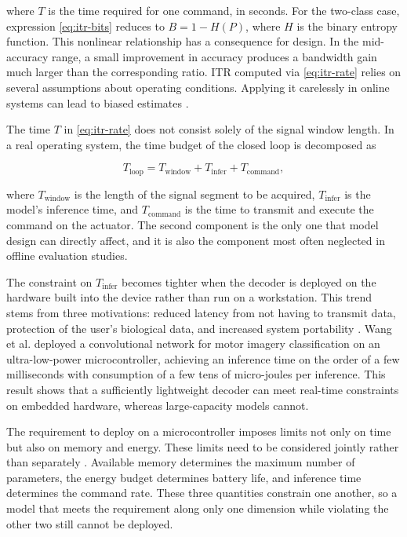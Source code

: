 where $T$ is the time required for one command, in seconds. For the
two-class case, expression \eqref{eq:itr-bits} reduces to
$B = 1 - H(P)$, where $H$ is the binary entropy function. This
nonlinear relationship has a consequence for design. In the
mid-accuracy range, a small improvement in accuracy produces a
bandwidth gain much larger than the corresponding ratio. ITR computed
via \eqref{eq:itr-rate} relies on several assumptions about operating
conditions. Applying it carelessly in online systems can lead to
biased estimates \cite{yuan2013study}.

The time $T$ in \eqref{eq:itr-rate} does not consist solely of the
signal window length. In a real operating system, the time budget of
the closed loop is decomposed as

\begin{equation}
\label{eq:latency}
T_{\mathrm{loop}} = T_{\mathrm{window}} + T_{\mathrm{infer}}
                  + T_{\mathrm{command}},
\end{equation}

where $T_{\mathrm{window}}$ is the length of the signal segment to be
acquired, $T_{\mathrm{infer}}$ is the model's inference time, and
$T_{\mathrm{command}}$ is the time to transmit and execute the
command on the actuator. The second component is the only one that
model design can directly affect, and it is also the component most
often neglected in offline evaluation studies.

The constraint on $T_{\mathrm{infer}}$ becomes tighter when the
decoder is deployed on the hardware built into the device rather than
run on a workstation. This trend stems from three motivations:
reduced latency from not having to transmit data, protection of the
user's biological data, and increased system portability
\cite{sun2025signal}. Wang et al. \cite{wang2024mibminet} deployed a
convolutional network for motor imagery classification on an
ultra-low-power microcontroller, achieving an inference time on the
order of a few milliseconds with consumption of a few tens of
micro-joules per inference. This result shows that a sufficiently
lightweight decoder can meet real-time constraints on embedded
hardware, whereas large-capacity models cannot.

The requirement to deploy on a microcontroller imposes limits not
only on time but also on memory and energy. These limits need to be
considered jointly rather than separately \cite{akbari2025atrial,
craighero2024ondevice}. Available memory determines the maximum
number of parameters, the energy budget determines battery life, and
inference time determines the command rate. These three quantities
constrain one another, so a model that meets the requirement along
only one dimension while violating the other two still cannot be
deployed.

